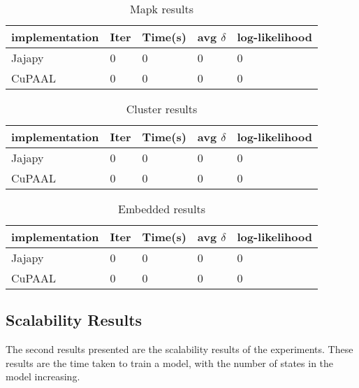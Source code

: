 \begin{table}[!htb]
    \centering
    \caption{Mapk results}
    \label{tab:mapk_results}
    \begin{tabular}{lllll}
        \toprule
        implementation & Iter & Time(s) & avg $\delta$ & log-likelihood \\
        \midrule
        Jajapy         & 0    & 0       & 0            & 0              \\
        CuPAAL         & 0    & 0       & 0            & 0              \\
        \bottomrule
    \end{tabular}
\end{table}

\begin{table}[!htb]
    \centering
    \caption{Cluster results}
    \label{tab:cluster_results}
    \begin{tabular}{lllll}
        \toprule
        implementation & Iter & Time(s) & avg $\delta$ & log-likelihood \\
        \midrule
        Jajapy         & 0    & 0       & 0            & 0              \\
        CuPAAL         & 0    & 0       & 0            & 0              \\
        \bottomrule
    \end{tabular}
\end{table}

\begin{table}[!htb]
    \centering
    \caption{Embedded results}
    \label{tab:embedded_results}
    \begin{tabular}{lllll}
        \toprule
        implementation & Iter & Time(s) & avg $\delta$ & log-likelihood \\
        \midrule
        Jajapy         & 0    & 0       & 0            & 0              \\
        CuPAAL         & 0    & 0       & 0            & 0              \\
        \bottomrule
    \end{tabular}
\end{table}

\subsection{Scalability Results}\label{subsec:results_scalability}
The second results presented are the scalability results of the experiments.
These results are the time taken to train a model, with the number of states in the model increasing.

